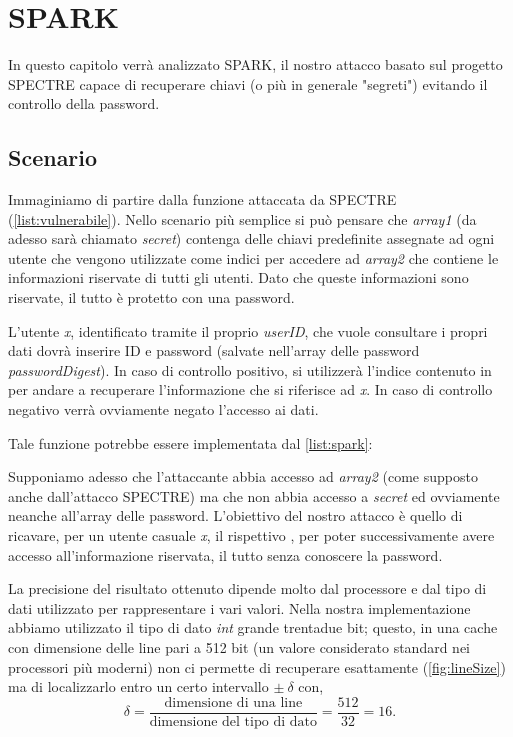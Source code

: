 \chapter{SPARK}
	In questo capitolo verrà analizzato \ac{SPARK}, il nostro attacco basato sul progetto SPECTRE capace di recuperare chiavi (o più in generale "segreti") evitando il controllo della password.
	
	\section{Scenario}
		Immaginiamo di partire dalla funzione attaccata da SPECTRE (\cref{list:vulnerabile}). Nello scenario più semplice si può pensare che \emph{array1} (da adesso sarà chiamato \emph{secret}) contenga delle chiavi predefinite assegnate ad ogni utente che vengono utilizzate come indici  per accedere ad \emph{array2} che contiene le informazioni riservate di tutti gli utenti. Dato che queste informazioni sono riservate, il tutto è protetto con una password. 
		
		L'utente \emph{x}, identificato tramite il proprio \emph{userID}, che vuole consultare i propri dati dovrà inserire ID e password (salvate nell'array delle password \emph{passwordDigest}). In caso di controllo positivo, si utilizzerà l'indice contenuto in  per andare a recuperare l'informazione che si riferisce ad \emph{x}. In caso di controllo negativo verrà ovviamente negato l'accesso ai dati.
		
		Tale funzione potrebbe essere implementata dal \cref{list:spark}:
		
		Supponiamo adesso che l'attaccante abbia accesso ad \emph{array2} (come supposto anche dall'attacco SPECTRE) ma che non abbia accesso a \emph{secret} ed ovviamente neanche all'array delle password. L'obiettivo del nostro attacco è quello di ricavare, per un utente casuale \emph{x}, il rispettivo , per poter successivamente avere accesso all'informazione riservata, il tutto senza conoscere la password.
		
		La precisione del risultato ottenuto dipende molto dal processore e dal tipo di dati utilizzato per rappresentare i vari valori. Nella nostra implementazione abbiamo utilizzato il tipo di dato \emph{int} grande trentadue bit; questo, in una cache con dimensione delle line pari a 512 bit (un valore considerato standard nei processori più moderni) non ci permette di recuperare esattamente  (\cref{fig:lineSize}) ma di localizzarlo entro un certo intervallo  $\pm \ \delta$ con, $$\delta = \frac{\text{dimensione di una line}}{\text{dimensione del tipo di dato}} = \frac{512}{32} = 16.$$
		

